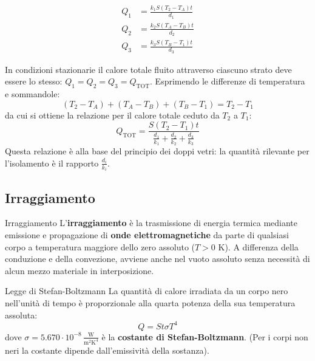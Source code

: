 \begin{align}
Q_1 &= \frac{k_1 S (T_2 - T_A) t}{d_1} \\
Q_2 &= \frac{k_2 S (T_A - T_B) t}{d_2} \\
Q_3 &= \frac{k_3 S (T_B - T_1) t}{d_3}
\end{align}

In condizioni stazionarie il calore totale fluito attraverso ciascuno strato deve essere lo stesso: $Q_1 = Q_2 = Q_3 = Q_{\text{TOT}}$.
Esprimendo le differenze di temperatura e sommandole:
\begin{equation}
(T_2 - T_A) + (T_A - T_B) + (T_B - T_1) = T_2 - T_1
\end{equation}
da cui si ottiene la relazione per il calore totale ceduto da $T_2$ a $T_1$:
\begin{equation}
\boxed{Q_{\text{TOT}} = \frac{S (T_2 - T_1) t}{\frac{d_1}{k_1} + \frac{d_2}{k_2} + \frac{d_3}{k_3}}}
\end{equation}
Questa relazione è alla base del principio dei doppi vetri: la quantità rilevante per l'isolamento è il rapporto $\frac{d_i}{k_i}$.

\subsection{Irraggiamento}
\begin{definizione}{Irraggiamento}
L'\textbf{irraggiamento} è la trasmissione di energia termica mediante emissione e propagazione di \textbf{onde elettromagnetiche} da parte di qualsiasi corpo a temperatura maggiore dello zero assoluto ($T > 0\text{ K}$). A differenza della conduzione e della convezione, avviene anche nel vuoto assoluto senza necessità di alcun mezzo materiale in interposizione.
\end{definizione}

\begin{teorema}{Legge di Stefan-Boltzmann}
La quantità di calore irradiata da un corpo nero nell'unità di tempo è proporzionale alla quarta potenza della sua temperatura assoluta:
\begin{equation}
\boxed{Q = S t \sigma T^4}
\end{equation}
dove $\sigma = 5.670 \cdot 10^{-8} \, \frac{\text{W}}{\text{m}^2 \text{K}^4}$ è la \textbf{costante di Stefan-Boltzmann}.
(Per i corpi non neri la costante dipende dall'emissività della sostanza).
\end{teorema}

